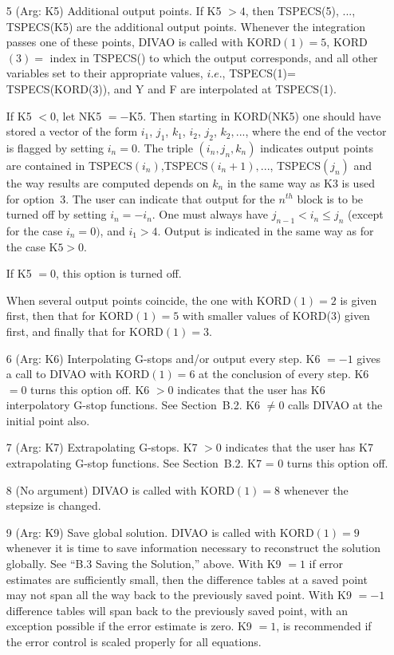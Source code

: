 \documentclass[twoside]{MATH77}
\begin{document}
\begin{itemize}
\item[5]  (Arg: K5) Additional output points. If K5 $>4$, then TSPECS(5),
..., TSPECS(K5) are the additional output points. Whenever the integration
passes one of these points, DIVAO is called with KORD$(1)=5$, KORD$(3)=$
index in TSPECS() to which the output corresponds, and all other variables
set to their appropriate values, $i.e.$, TSPECS(1)= TSPECS(KORD(3)), and
Y and F are interpolated at TSPECS(1).

If K5 $<0$, let NK5 $=-$K5. Then starting in KORD(NK5) one should have
stored a vector of the form $i_1$, $j_1$, $k_1$, $i_2$, $j_2$, $k_2,...$,
where the end of the vector is flagged by setting $i_n=0$. The triple $%
(i_n,j_n,k_n)$ indicates output points are contained in TSPECS$(i_n)$,TSPECS$%
(i_n+1),...$, TSPECS$(j_n)$ and the way results are computed depends on $k_n$
in the same way as K3 is used for option~3. The user can indicate that
output for the $n^{th}$ block is to be turned off by setting $i_n=-i_n$. One
must always have $j_{n-1}<i_n\leq j_n$ (except for the case $i_n=0)$, and
$i_1>4$. Output is indicated in the same way as for the case
$\text{K5}>0.$

If K5 $=0$, this option is turned off.

When several output points coincide, the one with KORD$(1)=2$ is given first,
then that for KORD$(1)=5$ with smaller values of KORD(3) given first, and
finally that for KORD$(1)=3.$

\item[6]  (Arg: K6) Interpolating G-stops and/or output every step. K6 $=-1$
gives a call to DIVAO with KORD$(1)=6$ at the conclusion of every step. K6 $%
=0$ turns this option off. K6 $>0$ indicates that the user has K6
interpolatory G-stop functions. See Section\ B.2. K6 $\neq 0$ calls DIVAO at the
initial point also.

\item[7]  (Arg: K7) Extrapolating G-stops. K7 $>0$ indicates that the user
has K7 extrapolating G-stop functions. See Section\ B.2.  K7 = 0
turns this option off.

\item[8]  (No argument) DIVAO is called with KORD$(1)=8$ whenever the
stepsize is changed.

\item[9]  (Arg: K9) Save global solution. DIVAO is called with KORD$(1)=9$
whenever it is time to save information necessary to reconstruct the
solution globally. See ``B.3 Saving the Solution,'' above.
With K9 $=1$ if error estimates are sufficiently small, then the difference
tables at a saved point may not span all the way back to the previously
saved point. With K9 $=-1$ difference tables will span back to the
previously saved point, with an exception possible if the error estimate is
zero. K9 $=1$, is recommended if the error control is scaled properly for
all equations.


\end{itemize}
\end{document}
